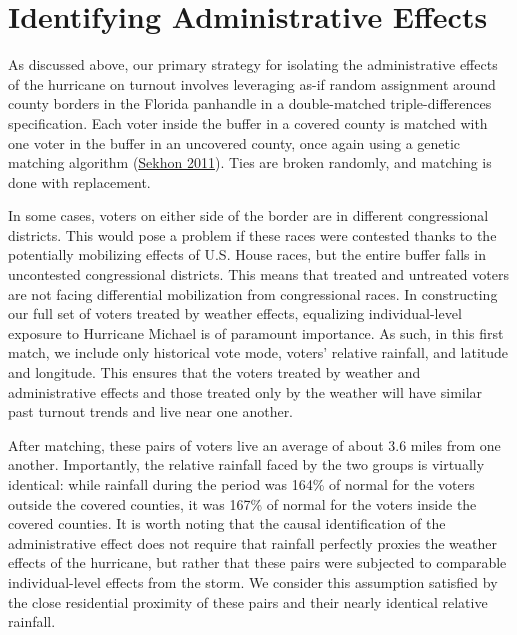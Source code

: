 \documentclass[
  12pt,
]{article}
\begin{document}
\hypertarget{identifying-administrative-effects}{%
\section*{Identifying Administrative Effects}\label{identifying-administrative-effects}}

As discussed above, our primary strategy for isolating the administrative effects of the hurricane on turnout involves leveraging as-if random assignment around county borders in the Florida panhandle in a double-matched triple-differences specification. Each voter inside the buffer in a covered county is matched with one voter in the buffer in an uncovered county, once again using a genetic matching algorithm (\protect\hyperlink{ref-Sekhon2011}{Sekhon 2011}). Ties are broken randomly, and matching is done with replacement.

In some cases, voters on either side of the border are in different congressional districts. This would pose a problem if these races were contested thanks to the potentially mobilizing effects of U.S. House races, but the entire buffer falls in uncontested congressional districts. This means that treated and untreated voters are not facing differential mobilization from congressional races. In constructing our full set of voters treated by weather effects, equalizing individual-level exposure to Hurricane Michael is of paramount importance. As such, in this first match, we include only historical vote mode, voters' relative rainfall, and latitude and longitude. This ensures that the voters treated by weather and administrative effects and those treated only by the weather will have similar past turnout trends and live near one another.

After matching, these pairs of voters live an average of about 3.6 miles from one another. Importantly, the relative rainfall faced by the two groups is virtually identical: while rainfall during the period was 164\% of normal for the voters outside the covered counties, it was 167\% of normal for the voters inside the covered counties. It is worth noting that the causal identification of the administrative effect does not require that rainfall perfectly proxies the weather effects of the hurricane, but rather that these pairs were subjected to comparable individual-level effects from the storm. We consider this assumption satisfied by the close residential proximity of these pairs and their nearly identical relative rainfall.
\end{document}
